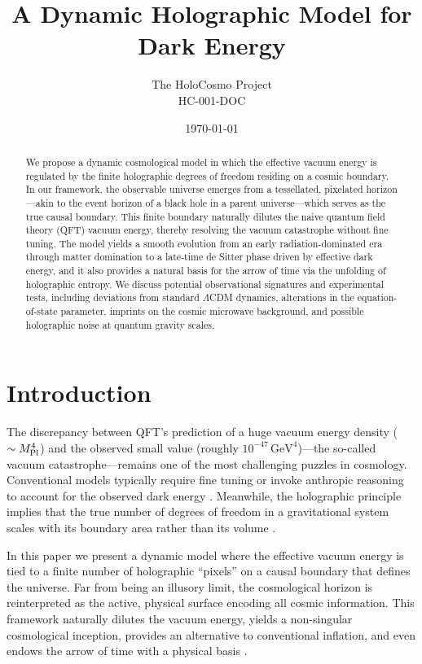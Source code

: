 \documentclass[12pt]{article}
\title{A Dynamic Holographic Model for Dark Energy}
\author{The HoloCosmo Project\\HC-001-DOC}
\date{\today}
\begin{document}
\maketitle

\begin{abstract}
We propose a dynamic cosmological model in which the effective vacuum energy is regulated by the finite holographic degrees of freedom residing on a cosmic boundary. In our framework, the observable universe emerges from a tessellated, pixelated horizon---akin to the event horizon of a black hole in a parent universe---which serves as the true causal boundary. This finite boundary naturally dilutes the naive quantum field theory (QFT) vacuum energy, thereby resolving the vacuum catastrophe without fine tuning. The model yields a smooth evolution from an early radiation-dominated era through matter domination to a late-time de Sitter phase driven by effective dark energy, and it also provides a natural basis for the arrow of time via the unfolding of holographic entropy. We discuss potential observational signatures and experimental tests, including deviations from standard $\Lambda$CDM dynamics, alterations in the equation-of-state parameter, imprints on the cosmic microwave background, and possible holographic noise at quantum gravity scales.
\end{abstract}

\section{Introduction}
The discrepancy between QFT’s prediction of a huge vacuum energy density ($\sim M_{\rm Pl}^4$) and the observed small value (roughly $10^{-47}\,\mathrm{GeV}^4$)---the so-called vacuum catastrophe---remains one of the most challenging puzzles in cosmology. Conventional models typically require fine tuning or invoke anthropic reasoning to account for the observed dark energy \cite{Weinberg1989,Sahni2008}. Meanwhile, the holographic principle implies that the true number of degrees of freedom in a gravitational system scales with its boundary area rather than its volume \cite{Susskind_1995,hooft2009,Bousso2002}.

In this paper we present a dynamic model where the effective vacuum energy is tied to a finite number of holographic ``pixels'' on a causal boundary that defines the universe. Far from being an illusory limit, the cosmological horizon is reinterpreted as the active, physical surface encoding all cosmic information. This framework naturally dilutes the vacuum energy, yields a non-singular cosmological inception, provides an alternative to conventional inflation, and even endows the arrow of time with a physical basis \cite{Jorgensen2006}.
\end{document}
